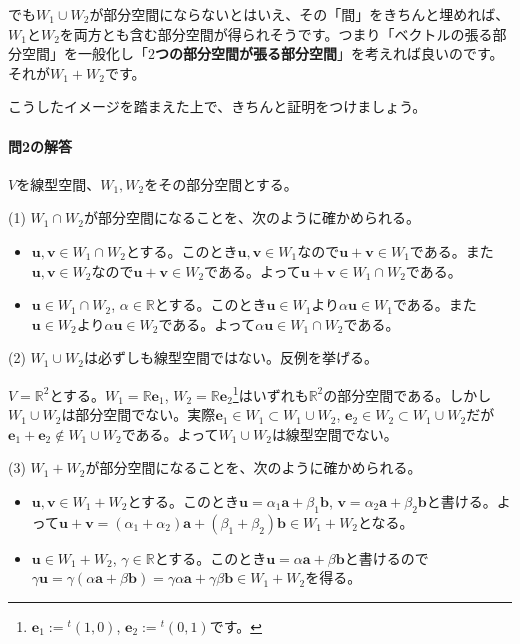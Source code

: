 でも$W_1\cup W_2$が部分空間にならないとはいえ、その「間」をきちんと埋めれば、$W_1$と$W_2$を両方とも含む部分空間が得られそうです。つまり「ベクトルの張る部分空間」を一般化し「\textbf{$2$つの部分空間が張る部分空間}」を考えれば良いのです。それが$W_1 + W_2$です。

こうしたイメージを踏まえた上で、きちんと証明をつけましょう。

\paragraph{問2の解答} $V$を線型空間、$W_1, W_2$をその部分空間とする。

\noindent (1) $W_1\cap W_2$が部分空間になることを、次のように確かめられる。
\begin{itemize}
\item $\bm{u}, \bm{v} \in W_1 \cap W_2$とする。このとき$\bm{u}, \bm{v}\in W_1$なので$\bm{u} + \bm{v} \in W_1$である。また$\bm{u}, \bm{v} \in W_2$なので$\bm{u} + \bm{v} \in W_2$である。よって$\bm{u} + \bm{v} \in W_1 \cap W_2$である。
\item $\bm{u}\in W_1\cap W_2$, $\alpha\in\mathbb{R}$とする。このとき$\bm{u}\in W_1$より$\alpha\bm{u} \in W_1$である。また$\bm{u}\in W_2$より$\alpha\bm{u} \in W_2$である。よって$\alpha \bm{u}\in W_1\cap W_2$である。
\end{itemize}

\noindent (2) $W_1\cup W_2$は必ずしも線型空間ではない。反例を挙げる。

$V = \mathbb{R}^2$とする。$W_1 = \mathbb{R}\bm{e}_1$, $W_2 = \mathbb{R}\bm{e}_2$\footnote{$\bm{e}_1 := {}^t(1,0)$, $\bm{e}_2 := {}^t(0,1)$です。}はいずれも$\mathbb{R}^2$の部分空間である。しかし$W_1 \cup W_2$は部分空間でない。実際$\bm{e}_1\in W_1 \subset W_1 \cup W_2$, $\bm{e}_2\in W_2 \subset W_1 \cup W_2$だが$\bm{e}_1 + \bm{e}_2 \not\in W_1\cup W_2$である。よって$W_1\cup W_2$は線型空間でない。

\noindent (3) $W_1 + W_2$が部分空間になることを、次のように確かめられる。
\begin{itemize}
\item $\bm{u}, \bm{v}\in W_1 +  W_2$とする。このとき$\bm{u} = \alpha_1 \bm{a} + \beta_1 \bm{b}$, $\bm{v} = \alpha_2 \bm{a} + \beta_2 \bm{b}$と書ける。よって$\bm{u} + \bm{v} = (\alpha_1 + \alpha_2)\bm{a} + (\beta_1 + \beta_2)\bm{b}\in W_1 +  W_2$となる。
\item $\bm{u}\in W_1 +  W_2$, $\gamma\in\mathbb{R}$とする。このとき$\bm{u} = \alpha\bm{a} + \beta\bm{b}$と書けるので$\gamma\bm{u} = \gamma(\alpha\bm{a} + \beta\bm{b}) = \gamma\alpha\bm{a} + \gamma\beta\bm{b}\in W_1 +  W_2$を得る。
\end{itemize}

